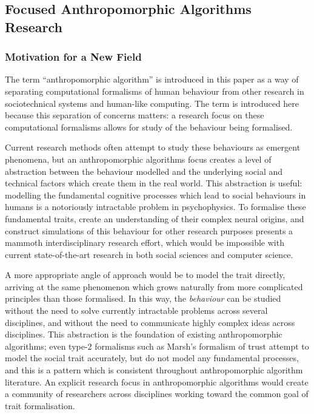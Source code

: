 \subsection{Focused Anthropomorphic Algorithms Research}
\subsubsection{Motivation for a New Field}
The term ``anthropomorphic algorithm'' is introduced in this paper as a way of separating computational formalisms of human behaviour from other research in sociotechnical systems and human-like computing. The term is introduced here because this separation of concerns matters: a research focus on these computational formalisms allows for study of the behaviour being formalised.\par

Current research methods often attempt to study these behaviours as emergent phenomena, but an anthropomorphic algorithms focus creates a level of abstraction between the behaviour modelled and the underlying social and technical factors which create them in the real world. This abstraction is useful: modelling the fundamental cognitive processes which lead to social behaviours in humans is a notoriously intractable problem in psychophysics. To formalise these fundamental traits, create an understanding of their complex neural origins, and construct simulations of this behaviour for other research purposes presents a mammoth interdisciplinary research effort, which would be impossible with current state-of-the-art research in both social sciences and computer science.\par

A more appropriate angle of approach would be to model the trait directly, arriving at the same phenomenon which grows naturally from more complicated principles than those formalised. In this way, the \emph{behaviour} can be studied without the need to solve currently intractable problems across several disciplines, and without the need to communicate highly complex ideas across disciplines. This abstraction is the foundation of existing anthropomorphic algorithms; even type-2 formalisms such as Marsh's formalism of trust attempt to model the social trait accurately, but do not model any fundamental processes, and this is a pattern which is consistent throughout anthropomorphic algorithm literature. An explicit research focus in anthropomorphic algorithms would create a community of researchers across disciplines working toward the common goal of trait formalisation.\par

